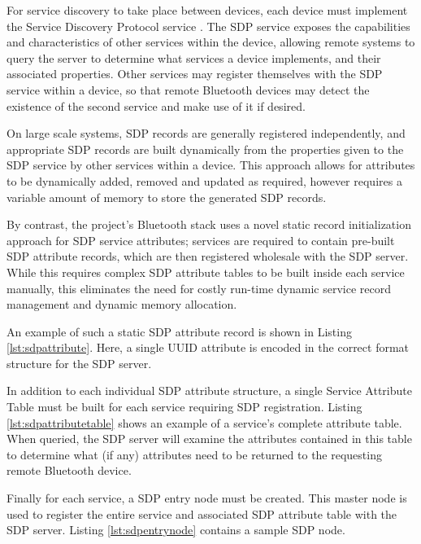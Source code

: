 For service discovery to take place between devices, each device must implement the Service Discovery Protocol service \cite{bt2p1specs_sdp}. The SDP service exposes the capabilities and characteristics of other services within the device, allowing remote systems to query the server to determine what services a device implements, and their associated properties. Other services may register themselves with the SDP service within a device, so that remote Bluetooth devices may detect the existence of the second service and make use of it if desired.

On large scale systems, SDP records are generally registered independently, and appropriate SDP records are built dynamically from the properties given to the SDP service by other services within a device. This approach allows for attributes to be dynamically added, removed and updated as required, however requires a variable amount of memory to store the generated SDP records. 

By contrast, the project's Bluetooth stack uses a novel static record initialization approach for SDP service attributes; services are required to contain pre-built SDP attribute records, which are then registered wholesale with the SDP server. While this requires complex SDP attribute tables to be built inside each service manually, this eliminates the need for costly run-time dynamic service record management and dynamic memory allocation.

An example of such a static SDP attribute record is shown in Listing \ref{lst:sdpattribute}. Here, a single UUID attribute is encoded in the correct format structure for the SDP server.



In addition to each individual SDP attribute structure, a single Service Attribute Table must be built for each service requiring SDP registration. Listing \ref{lst:sdpattributetable} shows an example of a service's complete attribute table. When queried, the SDP server will examine the attributes contained in this table to determine what (if any) attributes need to be returned to the requesting remote Bluetooth device.



Finally for each service, a SDP entry node must be created. This master node is used to register the entire service and associated SDP attribute table with the SDP server. Listing \ref{lst:sdpentrynode} contains a sample SDP node.

